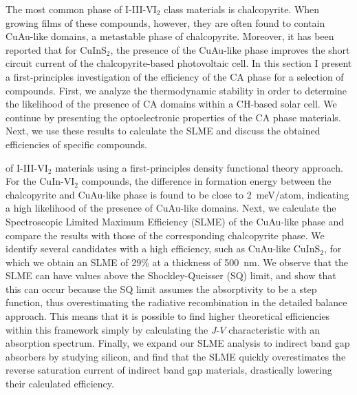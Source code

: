 \begin{refsection}
The most common phase of I-III-VI$_2$ class materials is chalcopyrite. When 
growing films of these compounds, however, they are often found to contain 
CuAu-like domains, a metastable phase of chalcopyrite. Moreover, it has been 
reported that for CuInS$_2$, the presence of the CuAu-like phase improves the 
short circuit current of the chalcopyrite-based photovoltaic cell. In this 
section I present a first-principles investigation of the efficiency of the CA 
phase for a selection of compounds. First, we analyze the thermodynamic 
stability in order to determine the likelihood of the presence of CA domains 
within a CH-based solar cell. We continue by presenting the optoelectronic 
properties of the CA phase materials. Next, we use these results to calculate 
the SLME and discuss the obtained efficiencies of specific compounds.  
 
of I-III-VI$_2$ materials using a first-principles density functional theory 
approach. For the \mbox{CuIn-VI$_2$} compounds, the difference in formation 
energy between the chalcopyrite and CuAu-like phase is found to be close to 
2~\si{\milli\electronvolt}/atom, indicating a high likelihood of the presence 
of CuAu-like domains. Next, we calculate the Spectroscopic Limited Maximum 
Efficiency (SLME) of the CuAu-like phase and compare the results with those of 
the corresponding chalcopyrite phase. We identify several candidates with a 
high efficiency, such as CuAu-like CuInS$_2$, for which we obtain an SLME of 
29\% at a thickness of 500~\si{\nano\meter}. We observe that the SLME can have 
values above the Shockley-Queisser (SQ) limit, and show that this can occur 
because the SQ limit assumes the absorptivity to be a step function, thus 
overestimating the radiative recombination in the detailed balance approach. 
This means that it is possible to find higher theoretical efficiencies within 
this framework simply by calculating the $J$-$V$ characteristic with an 
absorption spectrum. Finally, we expand our SLME analysis to indirect band gap 
absorbers by studying silicon, and find that the SLME quickly overestimates 
the reverse saturation current of indirect band gap materials, drastically 
lowering their calculated efficiency. 
 
 

\end{refsection}
